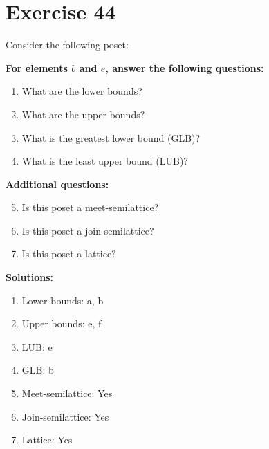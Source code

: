 \documentclass{article}
\begin{document}
\section*{Exercise 44}
Consider the following poset:
\begin{center}
\end{center}

    \textbf{For elements $b$ and $e$, answer the following questions:}
\begin{enumerate}
    \item What are the lower bounds?
    \item What are the upper bounds?
    \item What is the greatest lower bound (GLB)?
    \item What is the least upper bound (LUB)?
\end{enumerate}
    \hspace*{3ex} \textbf{Additional questions:}
\begin{enumerate}
    \setcounter{enumi}{4}
    \item Is this poset a meet-semilattice?
    \item Is this poset a join-semilattice?
    \item Is this poset a lattice?
\end{enumerate}

\textbf{Solutions:}
\begin{enumerate}
    \item Lower bounds: {a, b}
    \item Upper bounds: {e, f}
    \item LUB: e
    \item GLB: b
    \item Meet-semilattice: Yes
    \item Join-semilattice: Yes
    \item Lattice: Yes
\end{enumerate}
\newpage
\end{document}
